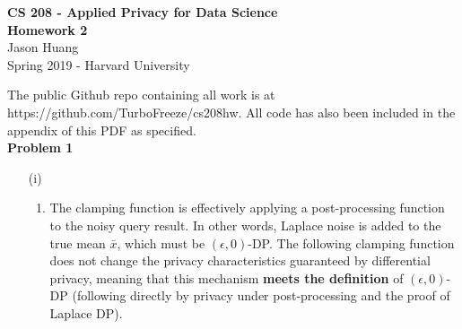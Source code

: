 \documentclass[12pt]{article}
\begin{document}
\begin{center}
	{\Large \textbf{CS 208 - Applied Privacy for Data Science}}\\
	{\Large \textbf{Homework 2}}\\
	\vspace*{0.1in}
	Jason Huang\\
	Spring 2019 - Harvard University\\
\end{center}

The public Github repo containing all work is at https://github.com/TurboFreeze/cs208hw. All code has also been included in the appendix of this PDF as specified.\\

{\large\textbf{Problem 1}}

\begin{enumerate}
	\item[(i)] \begin{enumerate}
	\item The clamping function is effectively applying a post-processing function to the noisy query result. In other words, Laplace noise is added to the true mean $\bar{x}$, which must be $(\epsilon, 0)$-DP. The following clamping function does not change the privacy characteristics guaranteed by differential privacy, meaning that this mechanism \textbf{meets the definition} of $(\epsilon, 0)$-DP (following directly by privacy under post-processing and the proof of Laplace DP).
	

\end{enumerate}
\end{enumerate}
\end{document}
